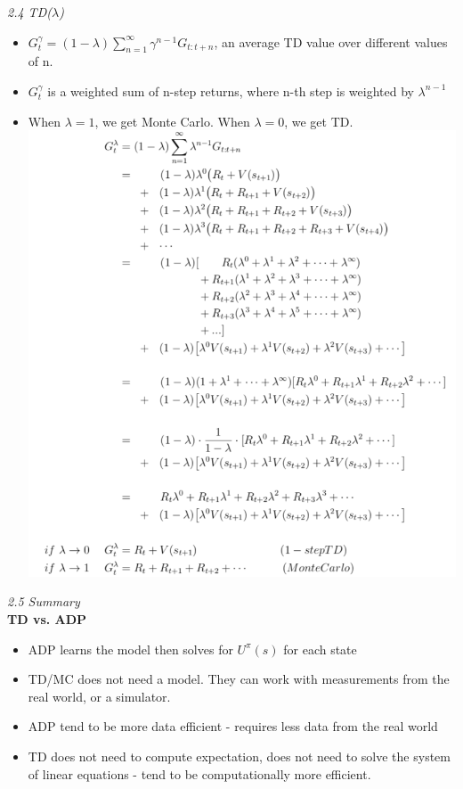 \documentclass[12pt]{article}
\begin{document}
\noindent
\textsl{2.4 TD($\lambda$)}
\begin{itemize}
\item $G_t^ \gamma = (1 - \lambda) \sum_{n=1}^{\infty} \gamma ^{n-1} G_{t:t+n}$, an average TD value over different values of n. 
\item $G_t^ \gamma$ is a weighted sum of n-step returns, where n-th step is weighted by $\lambda ^{n-1}$ 
\item When $\lambda=1$, we get Monte Carlo. When $\lambda = 0$, we get TD. \\
\includegraphics[scale=0.42]{td}\\
\end{itemize}

\noindent
\textsl{2.5 Summary}\\

\textbf{TD vs. ADP}
\begin{itemize}
\item ADP learns the model then solves for $U^\pi(s)$ for each state
\item TD/MC does not need a model. They can work with measurements from the real world, or a simulator. 
\item ADP tend to be more data efficient - requires less data from the real world
\item TD does not need to compute expectation, does not need to solve the system of linear equations - tend to be computationally more efficient.
\end{itemize}
\end{document}
